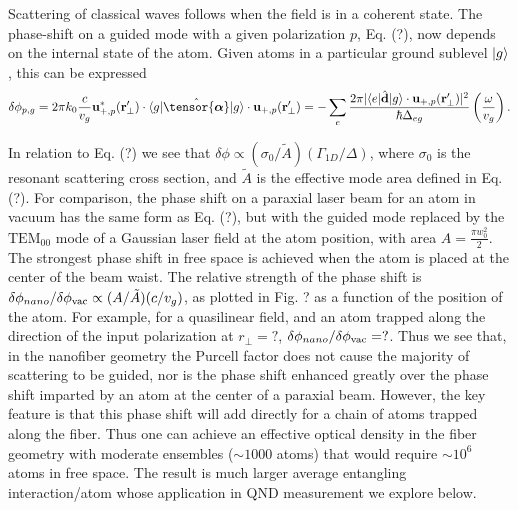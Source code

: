 \documentclass[preprint,aps,pra,onecolumn]{revtex4-1} %
\newcommand{\vac}{{\rm vac}}
\begin{document}
Scattering of classical waves follows when the field is in a coherent state.  The phase-shift on a guided 
mode with a given polarization $p$, Eq. (?), now depends on the internal state of the atom.  Given atoms 
in a particular ground sublevel $\lvert{g}\rangle$, this can be expressed
\begin{equation}
\delta  \phi_{p,g} =2\pi k_0 \frac{c}{v_g}\mathbf{u}^*_{+, p}(\br'_\perp) \cdot \bra{g} 
\hat{\tensor{\boldsymbol{\alpha}}} \ket{g} \cdot \mathbf{u}_{+, p}(\br'_\perp) = -\sum_e \frac{2 \pi 
|\bra{e}\hat{\mathbf{d}}\ket{g} \cdot \mathbf{u}_{+,p}(\br'_\perp)|^2}{\hbar \Delta_{eg}} 
\left(\frac{\omega}{v_g}\right).
\end{equation}

In relation to Eq. (?) we see that $\delta \phi \propto (\sigma_0/\tilde{A}) (\Gamma_{1D}/\Delta)$, where 
$\sigma_0$ is the resonant scattering cross section, and $\tilde{A}$ is the effective mode area defined in 
Eq. (?).  For comparison, the phase shift on a paraxial laser beam for an atom in vacuum has the same 
form as Eq. (?), but with the guided mode replaced by the  $\mathrm{TEM}_{00}$ mode of a Gaussian 
laser field at the atom position, with area $A=\frac{\pi w_0^2}{2}$. The strongest phase shift in free 
space is achieved when the atom is placed at the center of the beam waist.   The relative strength of the 
phase shift is $\delta \phi_{nano}/\delta \phi_{\vac}\propto (A/\tilde{A}) (c/v_g)$, as plotted in Fig. ? as a 
function of the position of the atom.  For example, for a quasilinear field, and an atom trapped along the 
direction of the input polarization  at $r_\perp = ?$, $\delta \phi_{nano}/\delta \phi_{\vac} = ?$.   Thus we 
see that, in the nanofiber geometry the Purcell factor does not cause the majority of scattering to be 
guided, nor is the phase shift enhanced greatly over the phase shift imparted by an atom at the center of 
a paraxial beam.  However, the key feature is that this phase shift will add directly for a chain of atoms 
trapped along the fiber.  Thus one can achieve an effective optical density in the fiber geometry with 
moderate ensembles ($\sim 1000$ atoms) that would require $\sim 10^6$ atoms in free space.  The 
result is much larger average entangling interaction/atom whose application in QND measurement we 
explore below.

\end{document}
